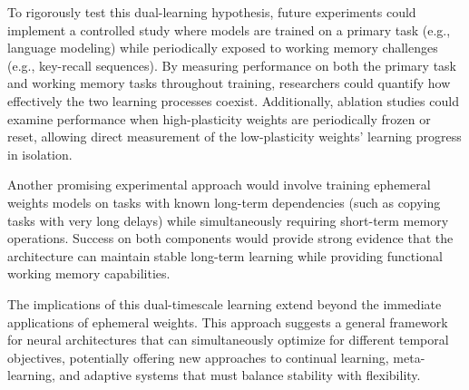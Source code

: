 To rigorously test this dual-learning hypothesis, future experiments could implement a controlled study where models are trained on a primary task (e.g., language modeling) while periodically exposed to working memory challenges (e.g., key-recall sequences). By measuring performance on both the primary task and working memory tasks throughout training, researchers could quantify how effectively the two learning processes coexist. Additionally, ablation studies could examine performance when high-plasticity weights are periodically frozen or reset, allowing direct measurement of the low-plasticity weights' learning progress in isolation.

Another promising experimental approach would involve training ephemeral weights models on tasks with known long-term dependencies (such as copying tasks with very long delays) while simultaneously requiring short-term memory operations. Success on both components would provide strong evidence that the architecture can maintain stable long-term learning while providing functional working memory capabilities.

The implications of this dual-timescale learning extend beyond the immediate applications of ephemeral weights. This approach suggests a general framework for neural architectures that can simultaneously optimize for different temporal objectives, potentially offering new approaches to continual learning, meta-learning, and adaptive systems that must balance stability with flexibility.
